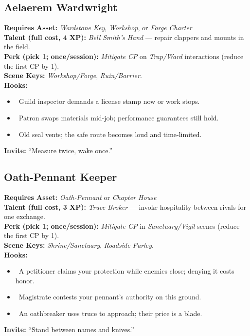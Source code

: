\documentclass[11pt]{article}
\begin{document}
\subsection*{Aelaerem Wardwright}
\textbf{Requires Asset:} \emph{Wardstone Key}, \emph{Workshop}, or \emph{Forge Charter}\\
\textbf{Talent (full cost, 4 XP):} \emph{Bell Smith's Hand} — repair clappers and mounts in the field.\\
\textbf{Perk (pick 1; once/session):} \emph{Mitigate CP} on \emph{Trap/Ward} interactions (reduce the first CP by 1).\\
\textbf{Scene Keys:} \emph{Workshop/Forge}, \emph{Ruin/Barrier}.\\[2pt]
\textbf{Hooks:}
\begin{itemize}
  \item \clubsuit~Guild inspector demands a license stamp now or work stops.
  \item \diamondsuit~Patron swaps materials mid-job; performance guarantees still hold.
  \item \spadesuit~Old seal vents; the safe route becomes loud and time-limited.
\end{itemize}
\textbf{Invite:} “Measure twice, wake once.”

\subsection*{Oath-Pennant Keeper}
\textbf{Requires Asset:} \emph{Oath-Pennant} or \emph{Chapter House}\\
\textbf{Talent (full cost, 3 XP):} \emph{Truce Broker} — invoke hospitality between rivals for one exchange.\\
\textbf{Perk (pick 1; once/session):} \emph{Mitigate CP} in \emph{Sanctuary/Vigil} scenes (reduce the first CP by 1).\\
\textbf{Scene Keys:} \emph{Shrine/Sanctuary}, \emph{Roadside Parley}.\\[2pt]
\textbf{Hooks:}
\begin{itemize}
  \item \heartsuit~A petitioner claims your protection while enemies close; denying it costs honor.
  \item \clubsuit~Magistrate contests your pennant’s authority on this ground.
  \item \spadesuit~An oathbreaker uses truce to approach; their price is a blade.
\end{itemize}
\textbf{Invite:} “Stand between names and knives.”
\end{document}
